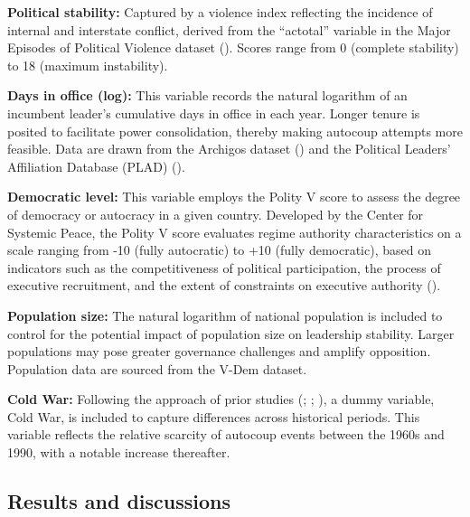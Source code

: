 \documentclass[
  12pt,
]{report}
\begin{document}
\textbf{Political stability:} Captured by a violence index reflecting
the incidence of internal and interstate conflict, derived from the
``actotal'' variable in the Major Episodes of Political Violence dataset
(). Scores
range from 0 (complete stability) to 18 (maximum instability).

\textbf{Days in office (log):} This variable records the natural
logarithm of an incumbent leader's cumulative days in office in each
year. Longer tenure is posited to facilitate power consolidation,
thereby making autocoup attempts more feasible. Data are drawn from the
Archigos dataset () and the Political Leaders' Affiliation Database (PLAD)
().

\textbf{Democratic level:} This variable employs the Polity V score to
assess the degree of democracy or autocracy in a given country.
Developed by the Center for Systemic Peace, the Polity V score evaluates
regime authority characteristics on a scale ranging from -10 (fully
autocratic) to +10 (fully democratic), based on indicators such as the
competitiveness of political participation, the process of executive
recruitment, and the extent of constraints on executive authority
().

\textbf{Population size:} The natural logarithm of national population
is included to control for the potential impact of population size on
leadership stability. Larger populations may pose greater governance
challenges and amplify opposition. Population data are sourced from the
V-Dem dataset.

\textbf{Cold War:} Following the approach of prior studies
(;
;
), a dummy variable,
Cold War, is included to capture differences across historical periods.
This variable reflects the relative scarcity of autocoup events between
the 1960s and 1990, with a notable increase thereafter.

\subsection*{Results and discussions}\label{results-and-discussions}
\end{document}
